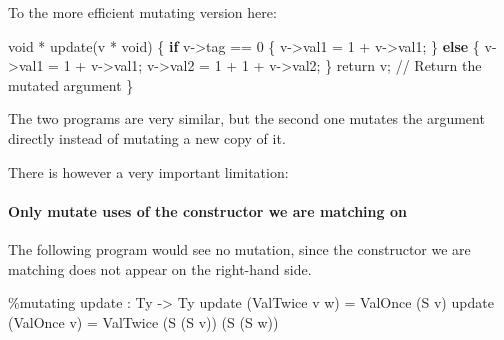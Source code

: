 \documentclass[
]{article}
\newenvironment{Shaded}{}{}
\newcommand{\DataTypeTok}[1]{\textcolor[rgb]{0.56,0.13,0.00}{#1}}
\newcommand{\DecValTok}[1]{\textcolor[rgb]{0.25,0.63,0.44}{#1}}
\newcommand{\FunctionTok}[1]{\textcolor[rgb]{0.02,0.16,0.49}{#1}}
\newcommand{\KeywordTok}[1]{\textcolor[rgb]{0.00,0.44,0.13}{\textbf{#1}}}
\newcommand{\NormalTok}[1]{#1}
\newcommand{\OperatorTok}[1]{\textcolor[rgb]{0.40,0.40,0.40}{#1}}
\newcommand{\OtherTok}[1]{\textcolor[rgb]{0.00,0.44,0.13}{#1}}
\begin{document}
To the more efficient mutating version here:

\begin{Shaded}
\begin{Highlighting}[]
\NormalTok{void }\OperatorTok{*}\NormalTok{ update(v }\OperatorTok{*}\NormalTok{ void) \{}
    \KeywordTok{if}\NormalTok{ v}\OtherTok{{-}\textgreater{}}\NormalTok{tag }\OperatorTok{==} \DecValTok{0}\NormalTok{ \{}
\NormalTok{        v}\OtherTok{{-}\textgreater{}}\NormalTok{val1 }\OtherTok{=} \DecValTok{1} \OperatorTok{+}\NormalTok{ v}\OtherTok{{-}\textgreater{}}\NormalTok{val1;}
\NormalTok{    \} }\KeywordTok{else}\NormalTok{ \{}
\NormalTok{        v}\OtherTok{{-}\textgreater{}}\NormalTok{val1 }\OtherTok{=} \DecValTok{1} \OperatorTok{+}\NormalTok{ v}\OtherTok{{-}\textgreater{}}\NormalTok{val1;}
\NormalTok{        v}\OtherTok{{-}\textgreater{}}\NormalTok{val2 }\OtherTok{=} \DecValTok{1} \OperatorTok{+} \DecValTok{1} \OperatorTok{+}\NormalTok{ v}\OtherTok{{-}\textgreater{}}\NormalTok{val2;}
\NormalTok{    \}}
    \FunctionTok{return}\NormalTok{ v; }\OperatorTok{//} \DataTypeTok{Return}\NormalTok{ the mutated argument}
\NormalTok{\}}
\end{Highlighting}
\end{Shaded}

The two programs are very similar, but the second one mutates the
argument directly instead of mutating a new copy of it.

There is however a very important limitation:

\hypertarget{only-mutate-uses-of-the-constructor-we-are-matching-on}{%
\paragraph{Only mutate uses of the constructor we are matching
on}\label{only-mutate-uses-of-the-constructor-we-are-matching-on}}

The following program would see no mutation, since the constructor we
are matching does not appear on the right-hand side.

\begin{Shaded}
\begin{Highlighting}[]
\OperatorTok{\%}\NormalTok{mutating}
\NormalTok{update }\OperatorTok{:} \DataTypeTok{Ty} \OtherTok{{-}\textgreater{}} \DataTypeTok{Ty}
\NormalTok{update (}\DataTypeTok{ValTwice}\NormalTok{ v w) }\OtherTok{=} \DataTypeTok{ValOnce}\NormalTok{ (}\DataTypeTok{S}\NormalTok{ v)}
\NormalTok{update (}\DataTypeTok{ValOnce}\NormalTok{ v) }\OtherTok{=} \DataTypeTok{ValTwice}\NormalTok{ (}\DataTypeTok{S}\NormalTok{ (}\DataTypeTok{S}\NormalTok{ v)) (}\DataTypeTok{S}\NormalTok{ (}\DataTypeTok{S}\NormalTok{ w))}
\end{Highlighting}
\end{Shaded}
\end{document}
